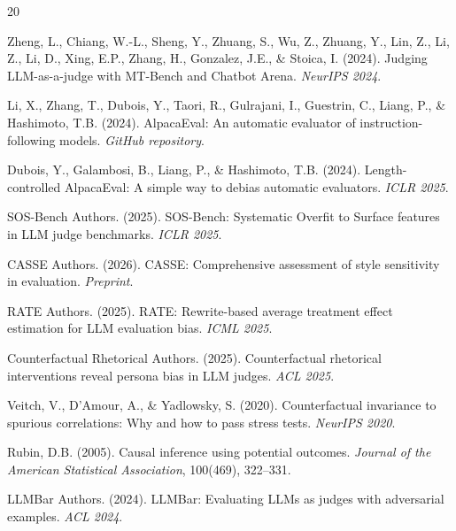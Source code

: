 \documentclass[11pt,a4paper]{article}
\begin{document}
\begin{thebibliography}{20}

Zheng, L., Chiang, W.-L., Sheng, Y., Zhuang, S., Wu, Z., Zhuang, Y., Lin, Z., Li, Z., Li, D., Xing, E.P., Zhang, H., Gonzalez, J.E., \& Stoica, I. (2024).
\newblock Judging LLM-as-a-judge with MT-Bench and Chatbot Arena.
\newblock \textit{NeurIPS 2024}.

Li, X., Zhang, T., Dubois, Y., Taori, R., Gulrajani, I., Guestrin, C., Liang, P., \& Hashimoto, T.B. (2024).
\newblock AlpacaEval: An automatic evaluator of instruction-following models.
\newblock \textit{GitHub repository}.

Dubois, Y., Galambosi, B., Liang, P., \& Hashimoto, T.B. (2024).
\newblock Length-controlled AlpacaEval: A simple way to debias automatic evaluators.
\newblock \textit{ICLR 2025}.

{SOS-Bench Authors}. (2025).
\newblock SOS-Bench: Systematic Overfit to Surface features in LLM judge benchmarks.
\newblock \textit{ICLR 2025}.

{CASSE Authors}. (2026).
\newblock CASSE: Comprehensive assessment of style sensitivity in evaluation.
\newblock \textit{Preprint}.

{RATE Authors}. (2025).
\newblock RATE: Rewrite-based average treatment effect estimation for LLM evaluation bias.
\newblock \textit{ICML 2025}.

{Counterfactual Rhetorical Authors}. (2025).
\newblock Counterfactual rhetorical interventions reveal persona bias in LLM judges.
\newblock \textit{ACL 2025}.

Veitch, V., D'Amour, A., \& Yadlowsky, S. (2020).
\newblock Counterfactual invariance to spurious correlations: Why and how to pass stress tests.
\newblock \textit{NeurIPS 2020}.

Rubin, D.B. (2005).
\newblock Causal inference using potential outcomes.
\newblock \textit{Journal of the American Statistical Association}, 100(469), 322--331.

{LLMBar Authors}. (2024).
\newblock LLMBar: Evaluating LLMs as judges with adversarial examples.
\newblock \textit{ACL 2024}.


\end{thebibliography}
\end{document}

